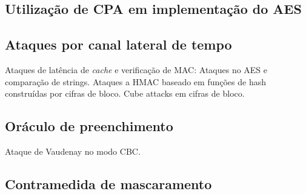 \subsection{Utilização de CPA em implementação do AES}

\subsection{Ataques por canal lateral de tempo}

Ataques de latência de \emph{cache} e verificação de MAC:
Ataques no AES e comparação de strings.
Ataques a HMAC baseado em funções de hash construídas por cifras de bloco.
Cube attacks em cifras de bloco.

\subsection{Oráculo de preenchimento}

Ataque de Vaudenay no modo CBC.

\subsection{Contramedida de mascaramento}
